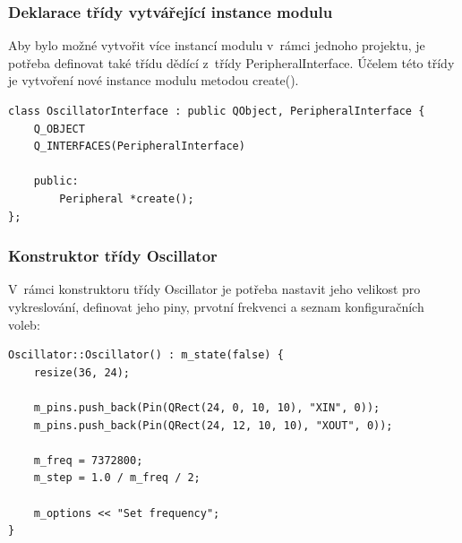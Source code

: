 \subsubsection{Deklarace třídy vytvářející instance modulu}

Aby bylo možné vytvořit více instancí modulu v~rámci jednoho projektu, je potřeba definovat také třídu dědící z~třídy PeripheralInterface. Účelem této třídy je vytvoření nové instance modulu metodou create().

\begin{lstlisting}
class OscillatorInterface : public QObject, PeripheralInterface {
	Q_OBJECT
	Q_INTERFACES(PeripheralInterface)

	public:
		Peripheral *create();
};
\end{lstlisting}

\subsubsection{Konstruktor třídy Oscillator}

V~rámci konstruktoru třídy Oscillator je potřeba nastavit jeho velikost pro vykreslování, definovat jeho piny, prvotní frekvenci a seznam konfiguračních voleb:

\begin{lstlisting}
Oscillator::Oscillator() : m_state(false) {
	resize(36, 24);

	m_pins.push_back(Pin(QRect(24, 0, 10, 10), "XIN", 0));
	m_pins.push_back(Pin(QRect(24, 12, 10, 10), "XOUT", 0));

	m_freq = 7372800;
	m_step = 1.0 / m_freq / 2;

	m_options << "Set frequency";
}
\end{lstlisting}

